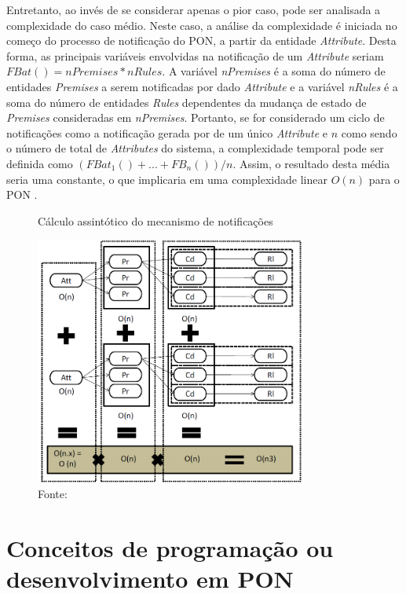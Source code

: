 Entretanto, ao invés de se considerar apenas o pior caso, pode ser analisada a
complexidade do caso médio. Neste caso, a análise da complexidade é iniciada no
começo do processo de notificação do PON, a partir da entidade
\textit{Attribute}. Desta forma, as principais variáveis envolvidas na
notificação de um \textit{Attribute} seriam $FBat() = nPremises * nRules$. A
variável \textit{nPremises} é a soma do número de entidades \textit{Premises} a
serem notificadas por dado \textit{Attribute} e a variável \textit{nRules} é a
soma do número de entidades \textit{Rules} dependentes da mudança de estado de
\textit{Premises} consideradas em \textit{nPremises}. Portanto, se for
considerado um ciclo de notificações como a notificação gerada por de um único
\textit{Attribute} e $n$ como sendo o número de total de \textit{Attributes} do
sistema, a complexidade temporal pode ser definida como $(FBat_{1}()+ ... +
FB_{n}()) / n$. Assim, o resultado desta média seria uma constante, o que
implicaria em uma complexidade linear $O(n)$ para o PON
\cite{doc_simao_2005,msc_Ronszcka_2012,doc_ronszcka_2019}.

\begin{figure}[!htb]
  \centering
  \caption{Cálculo assintótico do mecanismo de notificações}
  \includegraphics[width=0.8\textwidth]{../figures/calculo_pon.png}
  \smallskip
  \caption*{Fonte: }
  \label{fig:calculo_pon}
\end{figure}

\section{Conceitos de programação ou desenvolvimento em
  PON}\label{sec:conceitos_pon}

